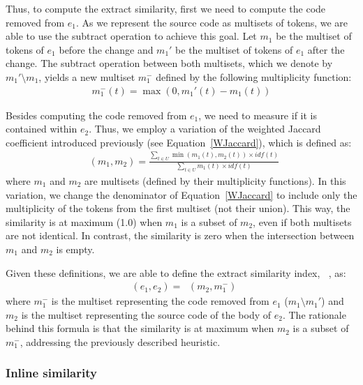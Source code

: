 \documentclass[10pt,journal,compsoc]{IEEEtran}
\DeclareMathOperator{\rdsimx}{sim_{x}}
\DeclareMathOperator{\rdsimc}{sim_{\subseteq}}
\begin{document}
Thus, to compute the extract similarity, first we need to compute the code removed from $e_1$. As we represent the source code as multisets of tokens, we are able to use the subtract operation to achieve this goal.
Let $m_1$ be the multiset of tokens of $e_1$ before the change and $m_1'$ be the multiset of tokens of $e_1$ after the change.
The subtract operation between both multisets, which we denote by $m_1' \setminus m_1$, yields a new multiset $m_1^-$ defined by the following multiplicity function:
\begin{align}
m_1^-(t) = \max(0, m_1'(t) - m_1(t))
\end{align}

Besides computing the code removed from $e_1$, we need to measure if it is contained within $e_2$. Thus, we employ a variation of the weighted Jaccard coefficient introduced previously (see Equation~\ref{WJaccard}), which is defined as:
\begin{align}
\rdsimc(m_1, m_2) = \frac{\sum_{t \in U} \min(m_1(t), m_2(t)) \times \mathit{idf}(t)}
                        {\sum_{t \in U} m_1(t) \times \mathit{idf}(t)}
\end{align}
where $m_1$ and $m_2$ are multisets (defined by their multiplicity functions).
In this variation, we change the denominator of Equation~\ref{WJaccard} to include only the multiplicity of the tokens from the first multiset (not their union).
This way, the similarity is at maximum (1.0) when $m_1$ is a subset of $m_2$, even if both multisets are not identical. In contrast, the similarity is zero when the intersection between $m_1$ and $m_2$ is empty.


Given these definitions, we are able to define the extract similarity index, $\rdsimx$, as:
\begin{align}
\rdsimx(e_1, e_2) = \rdsimc(m_2, m_1^-)
\end{align}
where $m_1^-$ is the multiset representing the code removed from $e_1$ ($m_1 \setminus m_1'$) and $m_2$ is the multiset representing the source code of the body of $e_2$.
The rationale behind this formula is that the similarity is at maximum
when $m_2$ is a subset of $m_1^-$, addressing the previously described heuristic.


\subsubsection{Inline similarity}
\label{SecSimI}
\end{document}
